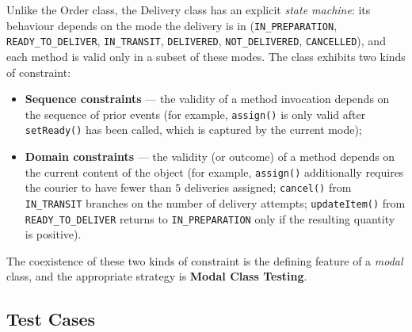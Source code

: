 \documentclass[11pt, a4paper]{article}
\newcommand{\code}[1]{\texttt{#1}}
\newcommand{\classname}[1]{\textsf{#1}}
\newcommand{\methodname}[1]{\texttt{#1()}}
\begin{document}
Unlike the \classname{Order} class, the \classname{Delivery} class has an explicit \emph{state machine}: its behaviour depends on the mode the delivery is in (\code{IN\_PREPARATION}, \code{READY\_TO\_DELIVER}, \code{IN\_TRANSIT}, \code{DELIVERED}, \code{NOT\_DELIVERED}, \code{CANCELLED}), and each method is valid only in a subset of these modes. The class exhibits two kinds of constraint:
\begin{itemize}
    \item \textbf{Sequence constraints} --- the validity of a method invocation depends on the sequence of prior events (for example, \methodname{assign} is only valid after \methodname{setReady} has been called, which is captured by the current mode);
    \item \textbf{Domain constraints} --- the validity (or outcome) of a method depends on the current content of the object (for example, \methodname{assign} additionally requires the courier to have fewer than $5$ deliveries assigned; \methodname{cancel} from \code{IN\_TRANSIT} branches on the number of delivery attempts; \methodname{updateItem} from \code{READY\_TO\_DELIVER} returns to \code{IN\_PREPARATION} only if the resulting quantity is positive).
\end{itemize}

\noindent The coexistence of these two kinds of constraint is the defining feature of a \emph{modal} class, and the appropriate strategy is \textbf{Modal Class Testing}.

\subsection{Test Cases}
\label{sec:delivery-tests}
\end{document}
